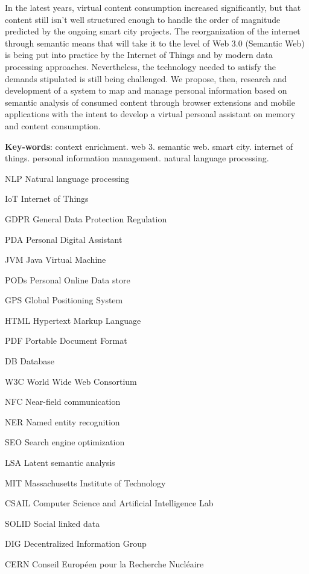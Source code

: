 \documentclass[
	12pt,				%
	openright,			%
	twoside,			%
	a4paper,			%
	english,			%
	french,				%
	spanish,			%
	brazil				%
	]{abntex2}
\begin{document}
\setlength{\absparsep}{18pt} %
\begin{resumo}[Abstract]
 In the latest years, virtual content consumption increased significantly, but that content still isn't well structured enough to handle the order of magnitude predicted by the ongoing smart city projects. The reorganization of the internet through semantic means that will take it to the level of Web 3.0 (Semantic Web) is being put into practice by the Internet of Things and by modern data processing approaches. Nevertheless, the technology needed to satisfy the demands stipulated is still being challenged. We propose, then, research and development of a system to map and manage personal information based on semantic analysis of consumed content through browser extensions and mobile applications with the intent to develop a virtual personal assistant on memory and content consumption.

 \textbf{Key-words}: context enrichment. web 3. semantic web. smart city. internet of things. personal information management. natural language processing.
\end{resumo}

\listoffigures*
\cleardoublepage

\begin{siglas}
    \item[NLP] Natural language processing
    \item[IoT] Internet of Things
    \item[GDPR] General Data Protection Regulation
    \item[PDA] Personal Digital Assistant
    \item[JVM] Java Virtual Machine
    \item[PODs] Personal Online Data store
    \item[GPS] Global Positioning System
    \item[HTML] Hypertext Markup Language
    \item[PDF] Portable Document Format
    \item[DB] Database
    \item[W3C] World Wide Web Consortium
    \item[NFC] Near-field communication
    \item[NER] Named entity recognition
    \item[SEO] Search engine optimization
    \item[LSA] Latent semantic analysis
    \item[MIT] Massachusetts Institute of Technology
    \item[CSAIL] Computer Science and Artificial Intelligence Lab
    \item[SOLID] Social linked data
    \item[DIG] Decentralized Information Group
    \item[CERN] Conseil Européen pour la Recherche Nucléaire
\end{siglas}
\end{document}
